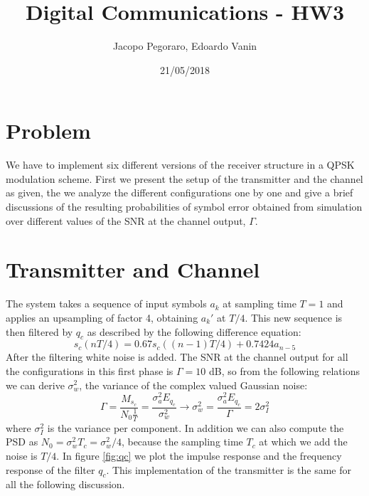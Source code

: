 \documentclass[a4paper,11.5pt]{article}
\title{Digital Communications - HW3}
\author{Jacopo Pegoraro, Edoardo Vanin}
\date{21/05/2018}
\begin{document}
\maketitle

\section*{Problem}

We have to implement six different versions of the receiver structure in a QPSK modulation scheme. First we present the setup of the transmitter and the channel as given, the we analyze the different configurations one by one and give a brief discussions of the resulting probabilities of symbol error obtained from simulation over different values of the SNR at the channel output, $\Gamma$. 

\section*{Transmitter and Channel}

The system takes a sequence of input symbols $a_k$ at sampling time $T=1$ and applies an upsampling of factor 4, obtaining $a_k'$ at $T/4$. This new sequence is then filtered by $q_c$ as described by the following difference equation:
\begin{equation}
s_c(nT/4) = 0.67 s_c((n-1)T/4) + 0.7424 a_{n-5}
\end{equation}
After the filtering white noise is added. The SNR at the channel output for all the configurations in this first phase is $\Gamma = 10$ dB, so from the following relations we can derive $\sigma_w^2$, the variance of the complex valued Gaussian noise:
\begin{equation}
\Gamma = \frac{M_{s_c}}{N_0\frac{1}{T}} = \frac{\sigma_a^2 E_{q_c}}{\sigma_w^2} \longrightarrow \sigma_w^2 = \frac{\sigma_a^2 E_{q_c}}{\Gamma} = 2\sigma_I^2
\end{equation}
where $\sigma_I^2$ is the variance per component. In addition we can also compute the PSD as $N_0=\sigma_w^2 T_c=\sigma_w^2/4$, because the sampling time $T_c$ at which we add the noise is $T/4$.
In figure \ref{fig:qc} we plot the impulse response and the frequency response of the filter $q_c$.
This implementation of the transmitter is the same for all the following discussion.
\end{document}

